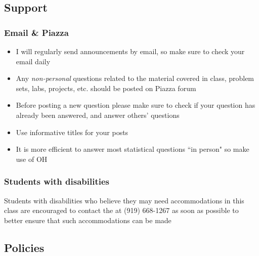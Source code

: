 \documentclass[11pt,containsverbatim,handout,xcolor=xelatex,dvipsnames,table]{beamer}
\begin{document}

\subsection{Support}


\begin{frame}
\frametitle{Email \& Piazza}

\begin{itemize}

\item I will regularly send announcements by email, so make sure to check your email  daily

\item Any \emph{non-personal} questions related to the material covered in class, problem sets, labs, projects, etc. should be posted on Piazza forum

\item Before posting a new question please make sure to check if your question has already been answered, and answer others' questions

\item Use informative titles for your posts

\item It is more efficient to answer most statistical questions ``in person" so make use of OH

\end{itemize}

\end{frame}


\begin{frame}
\frametitle{Students with disabilities}

Students with disabilities who believe they may need accommodations in this class are encouraged to contact the  at (919) 668-1267 as soon as possible to better ensure that such accommodations can be made

\vfill


\end{frame}


\subsection{Policies}
\end{document}
